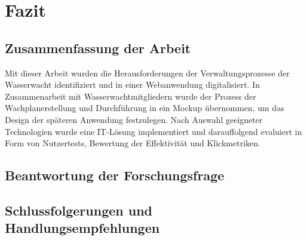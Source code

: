 \documentclass[fontsize=12pt,openright,oneside,paper=a4,BCOR=1cm]{scrbook}
\begin{document}
%
%

\renewcommand{\cleardoublepage}{}
\chapter{Fazit}

\section{Zusammenfassung der Arbeit}
Mit dieser Arbeit wurden die Herausforderungen der Verwaltungsprozesse der Wasserwacht identifiziert und in einer Webanwendung digitalisiert. In Zusammenarbeit mit Wasserwachtmitgliedern wurde der Prozess der Wachplanerstellung und Durchführung in ein Mockup übernommen, um das Design der späteren Anwendung festzulegen. Nach Auswahl geeigneter Technologien wurde eine IT-Lösung implementiert und darauffolgend evaluiert in Form von Nutzertests, Bewertung der Effektivität und Klickmetriken. 

\section{Beantwortung der Forschungsfrage}




\section{Schlussfolgerungen und Handlungsempfehlungen}

%
%

\renewcommand{\cleardoublepage}{}
\end{document}
